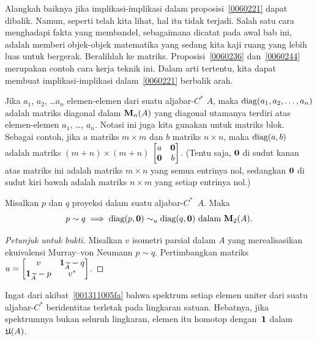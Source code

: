 Alangkah baiknya jika implikasi-implikasi dalam proposisi~\ref{0060221} dapat dibalik. Namun, seperti telah kita lihat, hal itu tidak terjadi.
Salah satu cara menghadapi fakta yang membandel, sebagaimana dicatat pada awal bab ini, adalah memberi objek-objek matematika
yang sedang kita kaji ruang yang lebih luas untuk bergerak. Beralihlah ke matriks. Proposisi~\ref{0060236} dan~\ref{0060244} merupakan contoh
cara kerja teknik ini. Dalam arti tertentu, kita dapat membuat implikasi-implikasi dalam~\ref{0060221} berbalik arah.

\begin{notn} Jika $a_1$, $a_2$, \dots $a_n$ elemen-elemen dari suatu aljabar-$C^*$ $A$, maka
$\operatorname{diag}(a_1,a_2,\dots,a_n)$ adalah matriks diagonal dalam $\mathbf{M}_{n}({A})$ yang diagonal utamanya terdiri atas
elemen-elemen $a_1$, \dots, $a_n$. Notasi ini juga kita gunakan untuk matriks blok. Sebagai
contoh, jika $a$ matriks $m \times m$ dan $b$ matriks $n \times n$, maka
$\operatorname{diag}(a,b)$ adalah matriks $(m+n) \times (m+n)$ $\begin{bmatrix} a & \mathbf{0} \\ \mathbf{0} & b
\end{bmatrix}$. (Tentu saja, $\mathbf{0}$ di sudut kanan atas matriks ini adalah matriks $m \times n$ yang semua
entrinya nol, sedangkan $\mathbf{0}$ di sudut kiri bawah adalah matriks $n \times m$ yang setiap entrinya nol.)
\end{notn}

\begin{prop}\label{0060236} Misalkan $p$ dan $q$ proyeksi dalam suatu aljabar-$C^*$~$A$. Maka
   \[ p \sim q \implies \operatorname{diag}(p,\mathbf{0}) \sim_u \operatorname{diag}(q,\mathbf{0}) \text{ dalam $\mathbf{M}_{2}({A})$.} \]
\end{prop}

\begin{proof}[\emph{Petunjuk untuk bukti}] Misalkan $v$ isometri parsial dalam $A$ yang merealisasikan ekuivalensi Murray--von Neumann $p \sim q$.
Pertimbangkan matriks $u = \begin{bmatrix} v  &  \mathbf{1}_{\widetilde{A}} - q  \\  \mathbf{1}_{\widetilde{A}} - p  &  v^* \end{bmatrix}$.  \ns
\end{proof}

Ingat dari akibat~\ref{001311005fa} bahwa spektrum setiap elemen uniter dari suatu aljabar-$C^*$ beridentitas terletak pada lingkaran satuan.
Hebatnya, jika spektrumnya bukan seluruh lingkaran, elemen itu homotop dengan~$\mathbf{1}$ dalam~$\mathfrak{U}(A)$.

